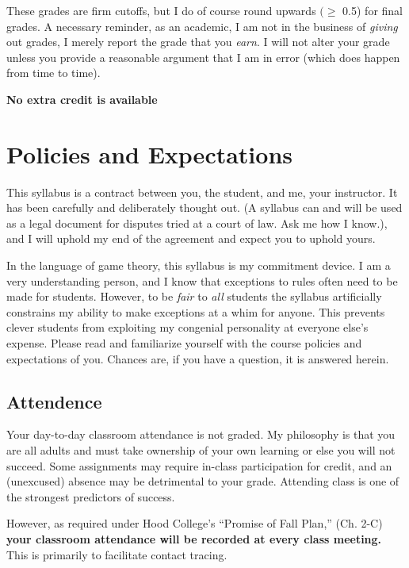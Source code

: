 \documentclass{article}
\begin{document}
These grades are firm cutoffs, but I do of course round upwards
\((\geq\) 0.5) for final grades. A necessary reminder, as an academic, I
am not in the business of \emph{giving} out grades, I merely report the
grade that you \emph{earn}. I will not alter your grade unless you
provide a reasonable argument that I am in error (which does happen from
time to time).

\textbf{No extra credit is available}

\hypertarget{policies-and-expectations}{%
\section{Policies and Expectations}\label{policies-and-expectations}}

This syllabus is a contract between you, the student, and me, your
instructor. It has been carefully and deliberately thought out. (A
syllabus can and will be used as a legal document for disputes tried at
a court of law. Ask me how I know.), and I will uphold my end of the
agreement and expect you to uphold yours.

In the language of game theory, this syllabus is my commitment device. I
am a very understanding person, and I know that exceptions to rules
often need to be made for students. However, to be \emph{fair} to
\emph{all} students the syllabus artificially constrains my ability to
make exceptions at a whim for anyone. This prevents clever students from
exploiting my congenial personality at everyone else's expense. Please
read and familiarize yourself with the course policies and expectations
of you. Chances are, if you have a question, it is answered herein.

\hypertarget{attendence}{%
\subsection{Attendence}\label{attendence}}

Your day-to-day classroom attendance is not graded. My philosophy is
that you are all adults and must take ownership of your own learning or
else you will not succeed. Some assignments may require in-class
participation for credit, and an (unexcused) absence may be detrimental
to your grade. Attending class is one of the strongest predictors of
success.

However, as required under Hood College's ``Promise of Fall Plan,'' (Ch.
2-C) \textbf{your classroom attendance will be recorded at every class
meeting.} This is primarily to facilitate contact tracing.
\end{document}

